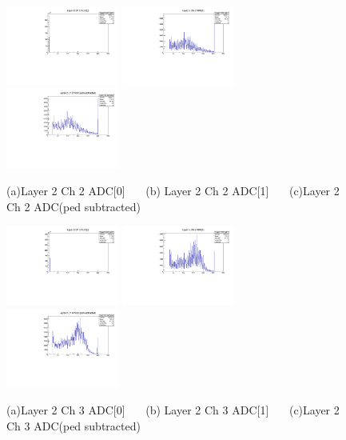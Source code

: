 \documentclass[a4paper,11pt]{article}
\theoremstyle{mytheor}
\begin{document}
\begin{figure}[H] 
\vspace*{-0.3cm} 
\includegraphics[width=0.33\textwidth,scale=0.5,trim=0 0 0 0,clip]{plotsdir/file0_test-Layer2_Ch2_adc0-1.pdf} 
\includegraphics[width=0.33\textwidth,scale=0.5,trim=0 0 0 0,clip]{plotsdir/file0_test-Layer2_Ch2_adc1-1.pdf} 
\includegraphics[width=0.33\textwidth,scale=0.5,trim=0 0 0 0,clip]{plotsdir/file0_test-Layer2_Ch2_adcPedsub-1.pdf} 
\caption{(a)Layer 2 Ch 2 ADC[0] ~~~(b) Layer 2 Ch 2 ADC[1] ~~~(c)Layer 2 Ch 2 ADC(ped subtracted) } 
\end{figure} 
\begin{figure}[H] 
\vspace*{-0.3cm} 
\includegraphics[width=0.33\textwidth,scale=0.5,trim=0 0 0 0,clip]{plotsdir/file0_test-Layer2_Ch3_adc0-1.pdf} 
\includegraphics[width=0.33\textwidth,scale=0.5,trim=0 0 0 0,clip]{plotsdir/file0_test-Layer2_Ch3_adc1-1.pdf} 
\includegraphics[width=0.33\textwidth,scale=0.5,trim=0 0 0 0,clip]{plotsdir/file0_test-Layer2_Ch3_adcPedsub-1.pdf} 
\caption{(a)Layer 2 Ch 3 ADC[0] ~~~(b) Layer 2 Ch 3 ADC[1] ~~~(c)Layer 2 Ch 3 ADC(ped subtracted) } 
\end{figure} 
\end{document}
